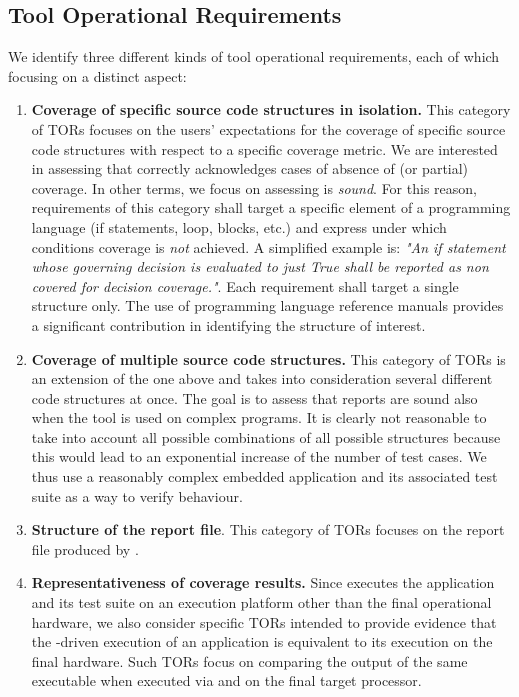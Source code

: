 \documentclass {report}
\begin{document}
\subsection{Tool Operational Requirements}
We identify three different kinds of tool operational requirements, each of which focusing on a distinct aspect:
\begin{enumerate}
\item \textbf{Coverage of specific source code structures in isolation.} This category of TORs focuses on the users' expectations for the coverage of specific source code structures with respect to a specific coverage metric. We are interested in assessing that \xcov correctly acknowledges cases of absence of (or partial) coverage. In other terms, we focus on assessing \xcov is \emph{sound}. For this reason, requirements of this category shall target a specific element of a programming language (if statements, loop, blocks, etc.) and express under which conditions coverage is \emph{not} achieved. A simplified example is: \emph{"An if statement whose governing decision is evaluated to just True shall be reported as non covered for decision coverage."}. Each requirement shall target a single structure only. The use of programming language reference manuals provides a significant contribution in identifying the structure of interest.

\item \textbf{Coverage of multiple source code structures.} This category of TORs is an extension of the one above and takes into consideration several different code structures at once. The goal is to assess that \xcov reports are sound also when the tool is used on complex programs. It is clearly not reasonable to take into account all possible combinations of all possible structures because this would lead to an exponential increase of the number of test cases. We thus use a reasonably complex embedded application and its associated test suite as a way to verify \xcov behaviour.

\item \textbf{Structure of the report file}. This category of TORs focuses on the report file produced by \xcov.

\item \textbf{Representativeness of coverage results.} Since \xcov executes the application and its test suite on an execution platform other than the final operational hardware, we also consider specific TORs intended to provide evidence that the \xcov-driven execution of an application is equivalent to its execution on the final hardware. Such TORs focus on comparing the output of the same executable when executed via \xcov and on the final target processor.
\end{enumerate}
\end{document}
